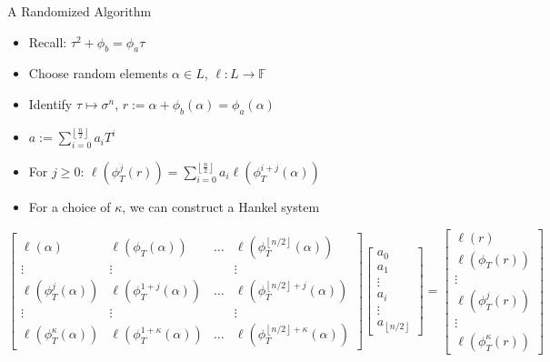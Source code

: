 \documentclass{beamer}
\newcommand{\f}{\mathbb{F}}
\begin{document}
\begin{frame}{A Randomized Algorithm}

\begin{itemize}
    \item Recall: $\tau^2 + \phi_b = \phi_a \tau$
    \item Choose random elements $\alpha \in L$, $\ell : L \to \f$
    \item Identify $\tau \mapsto \sigma^n$, $r := \alpha + \phi_b(\alpha) = \phi_a(\alpha)$
    \item $a := \sum_{i=0}^{\left\lfloor \frac{n}{2} \right\rfloor}a_iT^i$
    \item For $j \geq 0$: $\ell(\phi_T^j(r)) = \sum_{i = 0}^{\left\lfloor{\frac{n}{2}} \right\rfloor}a_i\ell(\phi_T^{i+j}(\alpha))$
    \item For a choice of $\kappa$, we can construct a Hankel system
\end{itemize}
\[ \begin{bmatrix}\ell(\alpha) & \ell(\phi_T(\alpha)) & \ldots & \ell(\phi_T^{\left\lfloor n/2 \right\rfloor}(\alpha)) \\ \vdots & \vdots & & \vdots \\ 

\ell(\phi_T^{j}(\alpha)) & \ell(\phi_T^{1+j}(\alpha)) & \ldots & \ell(\phi_T^{\left\lfloor n/2 \right\rfloor+j}(\alpha)) \\ \vdots & \vdots & & \vdots \\

\ell(\phi_T^{\kappa}(\alpha)) & \ell(\phi_T^{1 + \kappa }(\alpha)) & \ldots & \ell(\phi_T^{\left\lfloor n/2 \right\rfloor + \kappa}(\alpha))

\end{bmatrix} \begin{bmatrix} a_0 \\ a_1 \\ \vdots \\ a_i \\ \vdots \\ a_{\left\lfloor n/2 \right\rfloor} \end{bmatrix} = \begin{bmatrix} \ell(r) \\ \ell(\phi_T(r)) \\ \vdots \\ \ell(\phi_T^j(r)) \\ \vdots  \\   \ell(\phi_T^{\kappa}(r)) \end{bmatrix} \]
    
\end{frame}
\end{document}
